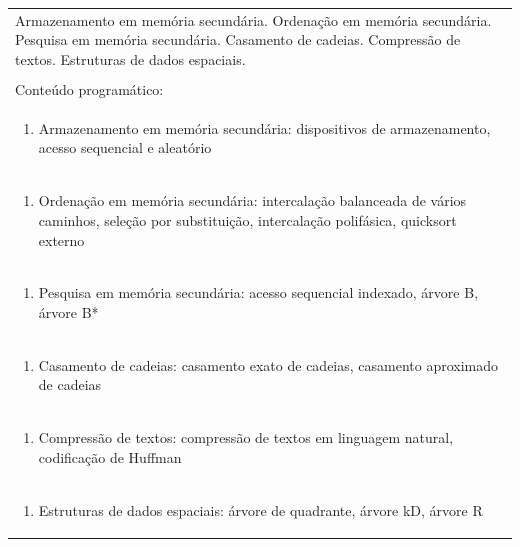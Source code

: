 \documentclass[11pt]{article}
\begin{document}
\begin{center}
\begin{longtable}{|p{4cm}|p{4cm}|p{4cm}|p{4cm}|}
\multicolumn{4}{|p{\dimexpr 16cm + 6\tabcolsep\relax}|}{Armazenamento em memória secundária. Ordenação em memória secundária. Pesquisa em memória secundária. Casamento de cadeias. Compressão de textos. Estruturas de dados espaciais.}\\
\multicolumn{4}{|p{16cm}|}{}\\
\hline
\multicolumn{4}{|p{16cm}|}{Conteúdo programático:}\\*
\multicolumn{4}{|p{\dimexpr 16cm + 6\tabcolsep\relax}|}{\begin{enumerate}[start=1]\item Armazenamento em memória secundária: dispositivos de armazenamento, acesso sequencial e aleatório\end{enumerate}}\\
\multicolumn{4}{|p{\dimexpr 16cm + 6\tabcolsep\relax}|}{\begin{enumerate}[start=2]\item Ordenação em memória secundária: intercalação balanceada de vários caminhos, seleção por substituição, intercalação polifásica, quicksort externo\end{enumerate}}\\
\multicolumn{4}{|p{\dimexpr 16cm + 6\tabcolsep\relax}|}{\begin{enumerate}[start=3]\item Pesquisa em memória secundária: acesso sequencial indexado, árvore B, árvore B*\end{enumerate}}\\
\multicolumn{4}{|p{\dimexpr 16cm + 6\tabcolsep\relax}|}{\begin{enumerate}[start=4]\item Casamento de cadeias: casamento exato de cadeias, casamento aproximado de cadeias\end{enumerate}}\\
\multicolumn{4}{|p{\dimexpr 16cm + 6\tabcolsep\relax}|}{\begin{enumerate}[start=5]\item Compressão de textos: compressão de textos em linguagem natural, codificação de Huffman\end{enumerate}}\\
\multicolumn{4}{|p{\dimexpr 16cm + 6\tabcolsep\relax}|}{\begin{enumerate}[start=6]\item Estruturas de dados espaciais: árvore de quadrante, árvore kD, árvore R\end{enumerate}}\\

\end{longtable}
\end{center}
\end{document}
